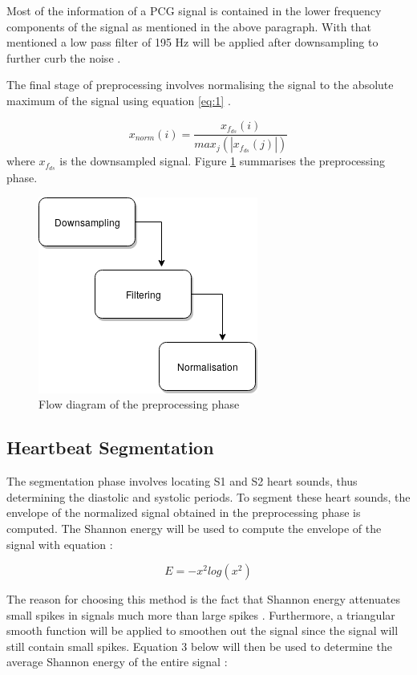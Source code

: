 \documentclass[10pt,twocolumn]{witseiepaper}
\begin{document}
Most of the information of a PCG signal is contained in the lower frequency components of the signal as mentioned in the above paragraph. With that mentioned a low pass filter of 195 Hz will be applied after downsampling to further curb the noise \cite{pascal}.

The final stage of preprocessing involves normalising the signal to the absolute maximum of the signal using equation \ref{eq:1} \cite{liang1997heart}.

\begin{equation}
    x_{norm}(i) = \frac{x_{f_{ds}}(i)}{max_{j}(|x_{f_{ds}}(j)|)}
    \label{eq:1}
\end{equation}{}
where $x_{f_{ds}}$ is the downsampled signal. 
Figure \ref{fig:pre} summarises the preprocessing phase.

\begin{figure}[h!]
    \centering
    \includegraphics[scale=0.8]{Project_Plan/preproc.png}
    \caption{Flow diagram of the preprocessing phase}
    \label{fig:pre}
\end{figure}{}

\subsection{Heartbeat Segmentation}
The segmentation phase involves locating S1 and S2 heart sounds, thus determining the diastolic and systolic periods. To segment these heart sounds, the envelope of the normalized signal obtained in the preprocessing phase is computed. The Shannon energy will be used to compute the envelope of the signal with equation \cite{liang1997heart}:

\begin{equation}
    E = -x^2log(x^2)
\end{equation}{}

The reason for choosing this method is the fact that Shannon energy attenuates small spikes in signals much more than large spikes \cite{liang1997heart}. Furthermore, a triangular smooth function will be applied to smoothen out the signal since the signal will still contain small spikes. Equation 3 below will then be used to determine the average Shannon energy of the entire signal \cite{liang1997heart}:
\end{document}
